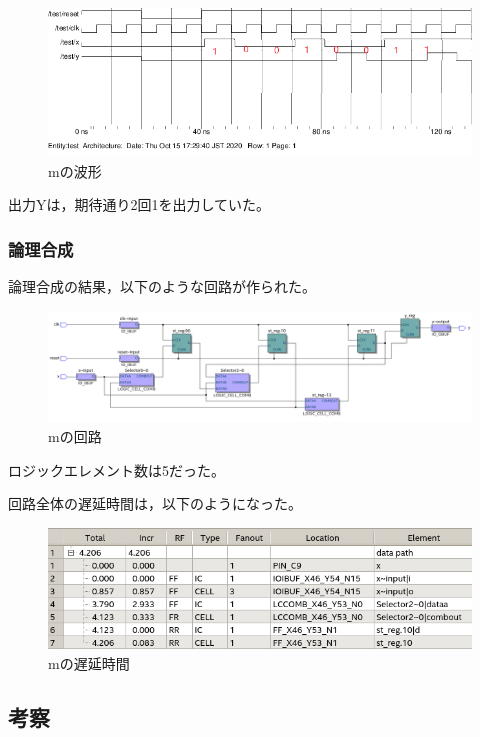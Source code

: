 \begin{figure}[H]
  \centering
  \includegraphics[width=\linewidth]{./src/m/mwave.png}
  \caption{mの波形}
\end{figure}

出力Yは，期待通り2回1を出力していた。

\subsubsection{論理合成}
論理合成の結果，以下のような回路が作られた。

\begin{figure}[H]
  \centering
  \includegraphics[width=\linewidth]{./src/m/mprint.png}
  \caption{mの回路}
  \label{mの回路}
\end{figure}

ロジックエレメント数は5だった。

回路全体の遅延時間は，以下のようになった。

\begin{figure}[H]
  \centering
  \includegraphics[width=\linewidth]{./src/m/mtiming.png}
  \caption{mの遅延時間}
\end{figure}

\subsection{考察}
